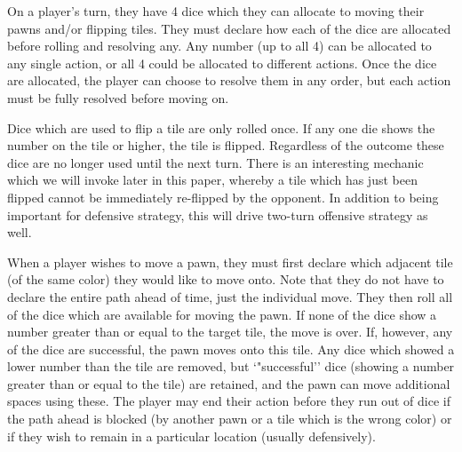 \documentclass[letterpaper]{article}
\begin{document}
On a player's turn, they have 4 dice which they can allocate to moving their
pawns and/or flipping tiles.  They must declare how each of the dice are 
allocated before rolling and resolving any.  Any number (up to all 4) can be
allocated to any single action, or all 4 could be allocated to different
actions.  Once the dice are allocated, the player can choose to resolve them
in any order, but each action must be fully resolved before moving on.

Dice which are used to flip a tile are only rolled once.  If any one die shows
the number on the tile or higher, the tile is flipped.  Regardless of the
outcome these dice are no longer used until the next turn.  There is an
interesting mechanic which we will invoke later in this paper, whereby a tile
which has just been flipped cannot be immediately re-flipped by the opponent.
In addition to being important for defensive strategy, this will drive
two-turn offensive strategy as well.

When a player wishes to move a pawn, they must first declare which adjacent
tile (of the same color) they would like to move onto.  Note that they do not 
have to declare the entire path ahead of time, just the individual move.  They
then roll all of the dice which are available for moving the pawn.  If none of
the dice show a number greater than or equal to the target tile, the move is
over.  If, however, any of the dice are successful, the pawn moves onto this
tile.  Any dice which showed a lower number than the tile are removed, but
`"successful'' dice (showing a number greater than or equal to the tile) are
retained, and the pawn can move additional spaces using these.  The player may
end their action before they run out of dice if the path ahead is blocked (by
another pawn or a tile which is the wrong color) or if they wish to remain in
a particular location (usually defensively).
\end{document}
